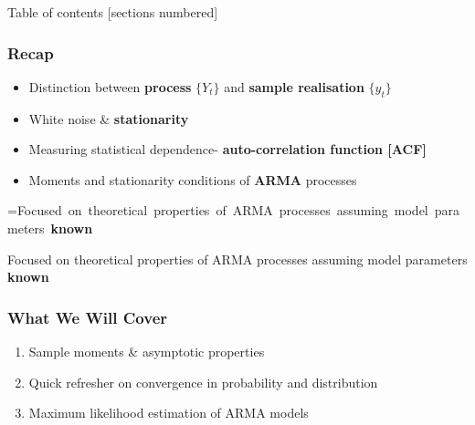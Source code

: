 \documentclass{beamer}
\title{\HUGE{Econometric Time Series Analysis$|$EC5221}}\subtitle{\vspace{4.5cm}\Large \textbf{Wk2: Stationary Univariate Time Series -\\ \textit{Estimation and Inference} }}
\date{\large \textbf{Nicky Grant} (Semester 2, 2020/2021)}
\makeatletter
\newcommand{\mybox}[1]{%
	\setbox0=\hbox{#1}%
	\setlength{\@tempdima}{\dimexpr\wd0+13pt}%
	\begin{tcolorbox}[colframe=ikb, colback=aliceblue ,boxrule=0.5pt,arc=4pt,
		left=6pt,right=6pt,top=6pt,bottom=6pt,boxsep=0pt,width=\@tempdima]
		#1
	\end{tcolorbox}
}
\makeatother
\begin{document}
		\begin{center}\maketitle \end{center}
		 \small
		\begin{frame}{Table of contents}
			[sections numbered]
			\tableofcontents[hideallsubsections]
		\end{frame}
		

\begin{frame}
\frametitle{Recap}\begin{center}
\begin{itemize}
\item[] Distinction between \textbf{process} $\{Y_t\}$ and \textbf{sample realisation  }$\{y_t\}$
\vspace{10pt}
\item[] White noise \& \textbf{stationarity}
\vspace{10pt}
\item[] Measuring statistical dependence- \textbf{auto-correlation function [ACF]}	
\vspace{10pt}
\item[] Moments and stationarity conditions of \textbf{ARMA} processes
\vspace{20pt}
\end{itemize}
\end{center}
\begin{center}
\mybox{Focused on theoretical properties of ARMA processes assuming model parameters \textbf{known}}
	\end{center}

\end{frame}







\begin{frame}
		\frametitle{What We Will Cover}

\begin{enumerate}
	\item[] Sample moments \& asymptotic properties 
			\vspace{15pt}
	\item[] Quick refresher on convergence in probability and distribution 
	
		\vspace{15pt}
	\item[] Maximum likelihood  estimation of ARMA models 

\end{enumerate}



\end{frame}
\end{document}

